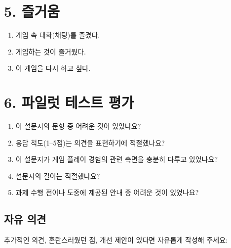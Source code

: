\documentclass[12pt]{article}
\begin{document}
\section*{5. 즐거움}

\begin{enumerate}[resume]
  \item 게임 속 대화(채팅)를 즐겼다.
  \item 게임하는 것이 즐거웠다.
  \item 이 게임을 다시 하고 싶다.
\end{enumerate}

\section*{6. 파일럿 테스트 평가}

\begin{enumerate}
  \item 이 설문지의 문항 중 어려운 것이 있었나요?
  \item 응답 척도(1–5점)는 의견을 표현하기에 적절했나요?
  \item 이 설문지가 게임 플레이 경험의 관련 측면을 충분히 다루고 있었나요?
  \item 설문지의 길이는 적절했나요?
  \item 과제 수행 전이나 도중에 제공된 안내 중 어려운 것이 있었나요?
\end{enumerate}

\subsection*{자유 의견}

추가적인 의견, 혼란스러웠던 점, 개선 제안이 있다면 자유롭게 작성해 주세요:
\end{document}
